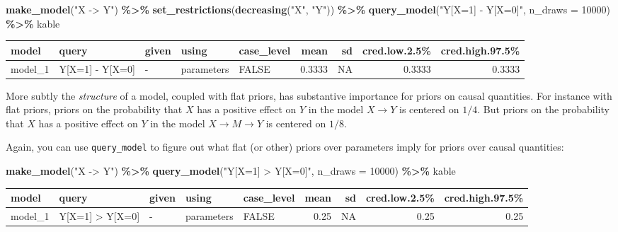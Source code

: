 \documentclass[
  12pt,
]{book}
\newenvironment{Shaded}{\begin{snugshade}}{\end{snugshade}}
\newcommand{\AttributeTok}[1]{\textcolor[rgb]{0.13,0.29,0.53}{#1}}
\newcommand{\DecValTok}[1]{\textcolor[rgb]{0.00,0.00,0.81}{#1}}
\newcommand{\FunctionTok}[1]{\textcolor[rgb]{0.13,0.29,0.53}{\textbf{#1}}}
\newcommand{\NormalTok}[1]{#1}
\newcommand{\SpecialCharTok}[1]{\textcolor[rgb]{0.81,0.36,0.00}{\textbf{#1}}}
\newcommand{\StringTok}[1]{\textcolor[rgb]{0.31,0.60,0.02}{#1}}
\begin{document}
\begin{Shaded}
\begin{Highlighting}[]
\FunctionTok{make\_model}\NormalTok{(}\StringTok{"X {-}\textgreater{} Y"}\NormalTok{) }\SpecialCharTok{\%\textgreater{}\%}
  \FunctionTok{set\_restrictions}\NormalTok{(}\FunctionTok{decreasing}\NormalTok{(}\StringTok{"X"}\NormalTok{, }\StringTok{"Y"}\NormalTok{)) }\SpecialCharTok{\%\textgreater{}\%}
  \FunctionTok{query\_model}\NormalTok{(}\StringTok{"Y[X=1] {-} Y[X=0]"}\NormalTok{, }\AttributeTok{n\_draws =} \DecValTok{10000}\NormalTok{) }\SpecialCharTok{\%\textgreater{}\%}
\NormalTok{  kable}
\end{Highlighting}
\end{Shaded}

\begin{tabular}{l|l|l|l|l|r|r|r|r}
\hline
model & query & given & using & case\_level & mean & sd & cred.low.2.5\% & cred.high.97.5\%\\
\hline
model\_1 & Y[X=1] - Y[X=0] & - & parameters & FALSE & 0.3333 & NA & 0.3333 & 0.3333\\
\hline
\end{tabular}

More subtly the \emph{structure} of a model, coupled with flat priors, has substantive importance for priors on causal quantities. For instance with flat priors, priors on the probability that \(X\) has a positive effect on \(Y\) in the model \(X \rightarrow Y\) is centered on \(1/4\). But priors on the probability that \(X\) has a positive effect on \(Y\) in the model \(X \rightarrow M \rightarrow Y\) is centered on \(1/8\).

Again, you can use \texttt{query\_model} to figure out what flat (or other) priors over parameters imply for priors over causal quantities:

\begin{Shaded}
\begin{Highlighting}[]
\FunctionTok{make\_model}\NormalTok{(}\StringTok{"X {-}\textgreater{} Y"}\NormalTok{) }\SpecialCharTok{\%\textgreater{}\%}
  \FunctionTok{query\_model}\NormalTok{(}\StringTok{"Y[X=1] \textgreater{} Y[X=0]"}\NormalTok{, }\AttributeTok{n\_draws =} \DecValTok{10000}\NormalTok{) }\SpecialCharTok{\%\textgreater{}\%}
\NormalTok{  kable}
\end{Highlighting}
\end{Shaded}

\begin{tabular}{l|l|l|l|l|r|r|r|r}
\hline
model & query & given & using & case\_level & mean & sd & cred.low.2.5\% & cred.high.97.5\%\\
\hline
model\_1 & Y[X=1] > Y[X=0] & - & parameters & FALSE & 0.25 & NA & 0.25 & 0.25\\
\hline
\end{tabular}
\end{document}
